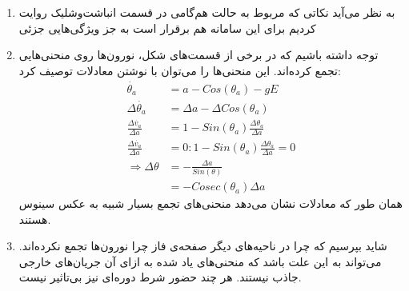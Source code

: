 \begin{enumerate}
	\item 
	به نظر می‌آید نکاتی که مربوط به حالت هم‌گامی در قسمت انباشت‌وشلیک روایت کردیم برای این سامانه هم برقرار است به جز ویژگی‌هایی جزئی
	\item 
	توجه داشته باشیم که در برخی از قسمت‌های شکل، نورون‌ها روی منحنی‌هایی تجمع کرده‌اند. این منحنی‌ها را می‌توان با نوشتن معادلات توصیف کرد:
	 \begin{align}
		\dot{\theta_a} &= a - Cos(\theta_a) - g E\\
		\Delta\dot{\theta_a} &= \Delta a - \Delta Cos(\theta_a)\\
		\frac{\Delta\dot{v_a}}{\Delta a} &= 1 - Sin(\theta_a)\frac{\Delta \theta_a}{\Delta a}\\
		\frac{\Delta\dot{v_a}}{\Delta a} &= 0 : 1 - Sin(\theta_a)\frac{\Delta \theta_a}{\Delta a} = 0\\
		\Rightarrow \Delta \theta &= - \frac{\Delta a}{Sin(\theta)}\\
		&= - Cosec(\theta_a) \Delta a
	\end{align}
همان طور که معادلات نشان می‌دهد منحنی‌های تجمع بسیار شبیه به عکس سینوس هستند. 
	\item 
	شاید بپرسیم که چرا در ناحیه‌های دیگر صفحه‌ی فاز چرا نورون‌ها تجمع نکرده‌اند. می‌تواند به این علت باشد که منحنی‌های یاد شده به ازای آن جریان‌های خارجی جاذب نیستند. هر چند حضور شرط دوره‌ای نیز بی‌تاثیر نیست.
\end{enumerate}

